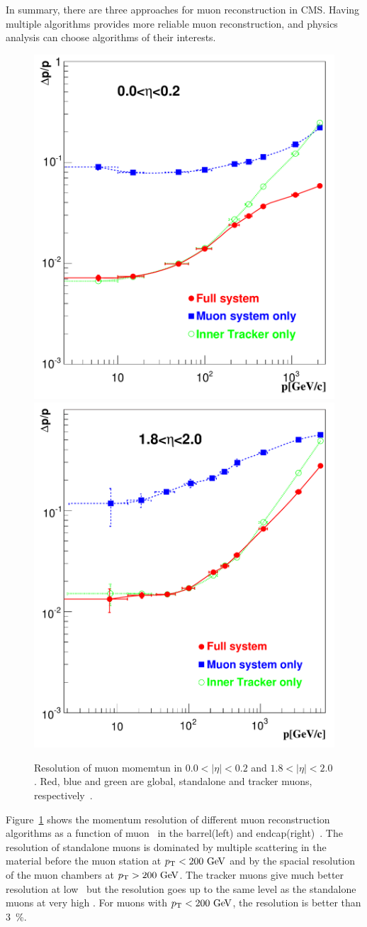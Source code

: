 In summary, there are three approaches for muon reconstruction in CMS. 
Having multiple algorithms provides more reliable muon reconstruction, 
and physics analysis can choose algorithms of their interests. 
\begin{figure}[!hbtp]
\centering
\includegraphics[width=.45\textwidth]{figures/Figure_001-005-a.pdf}
\includegraphics[width=.45\textwidth]{figures/Figure_001-005-b.pdf}
\caption{Resolution of muon momemtun in $0.0<|\eta|<0.2$ and $1.8<|\eta|<2.0$. 
Red, blue and green are global, standalone and tracker muons, 
respectively~\cite{cmstdr1}.} 
\label{fig:muon_res}
\end{figure}
Figure~\ref{fig:muon_res} shows the momentum resolution of different muon 
reconstruction algorithms as a function of muon \pt\ 
in the barrel(left) and endcap(right)~\cite{cmstdr1}. 
The resolution of standalone muons is dominated by multiple scattering in the material 
before the muon station at $p_\mathrm{T}<200~\mathrm{Ge\kern -0.1em V}$  and by the spacial resolution 
of the muon chambers at $p_\mathrm{T}>200~\mathrm{Ge\kern -0.1em V}$. The tracker muons give much better 
resolution at low \pt\, but the resolution goes up to the same level 
as the standalone muons at very high \pt. For muons with $p_\mathrm{T}<200~\mathrm{Ge\kern -0.1em V}$, 
the resolution is better than 3~\%.

